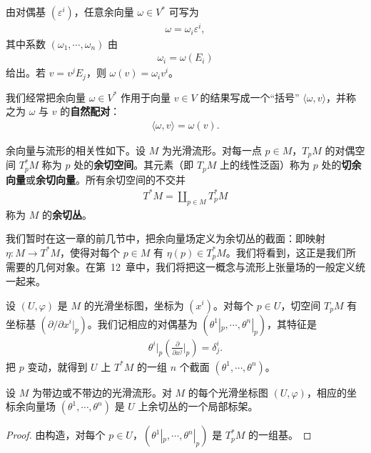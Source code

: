 \documentclass[../../main.tex]{subfiles}
\begin{document}
由对偶基 $(\varepsilon^i)$，任意余向量 $\omega\in V^*$ 可写为
\begin{align*}
\omega=\omega_i\varepsilon^i,
\end{align*}
其中系数 $(\omega_1,\cdots ,\omega_n)$ 由
\begin{align*}
\omega_i=\omega(E_i)
\end{align*}
给出。若 $v=v^jE_j$，则 $\omega(v)=\omega_i v^i$。

我们经常把余向量 $\omega\in V^*$ 作用于向量 $v\in V$ 的结果写成一个“括号” $\langle\omega,v\rangle$，并称之为 $\omega$ 与 $v$ 的\textbf{自然配对}：
\begin{align}
\langle\omega,v\rangle=\omega(v).\label{align:ch11-自然配对}
\end{align}

余向量与流形的相关性如下。设 $M$ 为光滑流形。对每一点 $p\in M$，$T_pM$ 的对偶空间 $T_p^*M$ 称为 $p$ 处的\textbf{余切空间}。其元素（即 $T_pM$ 上的线性泛函）称为 $p$ 处的\textbf{切余向量}或\textbf{余切向量}。所有余切空间的不交并
\begin{align*}
T^*M=\coprod_{p\in M}T_p^*M
\end{align*}
称为 $M$ 的\textbf{余切丛}。

我们暂时在这一章的前几节中，把余向量场定义为余切丛的截面：即映射 $\eta\colon M\to T^*M$，使得对每个 $p\in M$ 有 $\eta(p)\in T_p^*M$。我们将看到，这正是我们所需要的几何对象。在第~12~章中，我们将把这一概念与流形上张量场的一般定义统一起来。

设 $(U,\varphi)$ 是 $M$ 的光滑坐标图，坐标为 $(x^i)$。对每个 $p\in U$，切空间 $T_pM$ 有坐标基 $(\partial/\partial x^i|_p)$。我们记相应的对偶基为 $(\theta^1|_p,\cdots ,\theta^n|_p)$，其特征是
\begin{align}
\theta^i|_p\left(\frac{\partial}{\partial x^j}\bigg|_p\right)=\delta^i_j.\label{align:ch11-坐标余基}
\end{align}
把 $p$ 变动，就得到 $U$ 上 $T^*M$ 的一组 $n$ 个截面 $(\theta^1,\cdots ,\theta^n)$。

\begin{proposition}\label{proposition:ch11-坐标余基标架}
设 $M$ 为带边或不带边的光滑流形。对 $M$ 的每个光滑坐标图 $(U,\varphi)$，相应的坐标余向量场 $(\theta^1,\cdots ,\theta^n)$ 是 $U$ 上余切丛的一个局部标架。
\end{proposition}

\begin{proof}
由构造，对每个 $p\in U$，$(\theta^1|_p,\cdots ,\theta^n|_p)$ 是 $T_p^*M$ 的一组基。
\end{proof}
\end{document}
